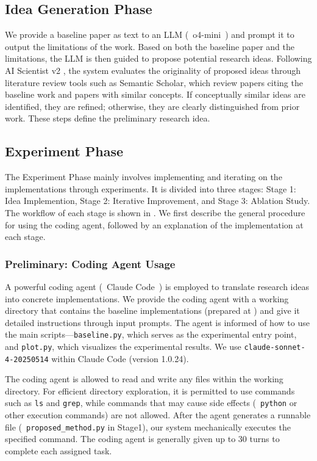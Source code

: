\subsection{Idea Generation Phase}
\label{subsec_idea_generation}
We provide a baseline paper as text to an LLM (\eg~o4-mini~\citep{o3-o4-mini}) and prompt it to output the limitations of the work. Based on both the baseline paper and the limitations, the LLM is then guided to propose potential research ideas.
Following AI Scientist v2 \citep{yamada2025ai}, the system evaluates the originality of proposed ideas through literature review tools such as Semantic Scholar, which review papers citing the baseline work and papers with similar concepts. If conceptually similar ideas are identified, they are refined; otherwise, they are clearly distinguished from prior work.
These steps define the preliminary research idea. 
\subsection{Experiment Phase}
The Experiment Phase mainly involves implementing and iterating on the implementations through experiments.
It is divided into three stages: Stage 1: Idea Implemention, Stage 2: Iterative Improvement, and Stage 3: Ablation Study. The workflow of each stage is shown in .
We first describe the general procedure for using the coding agent, followed by an explanation of the implementation at each stage.

\label{subsec_experiment}
\subsubsection{Preliminary: Coding Agent Usage}

A powerful coding agent (\eg~Claude Code~\citep{claude_code}) is employed to translate research ideas into concrete implementations.
We provide the coding agent with a working directory that contains the baseline implementations (prepared at ) and give it detailed instructions through input prompts.  
The agent is informed of how to use the main scripts—\texttt{baseline.py}, which serves as the experimental entry point, and \texttt{plot.py}, which visualizes the experimental results.  
We use \texttt{claude-sonnet-4-20250514} within Claude Code (version 1.0.24).

The coding agent is allowed to read and write any files within the working directory.  
For efficient directory exploration, it is permitted to use commands such as \texttt{ls} and \texttt{grep}, while commands that may cause side effects (\eg~\texttt{python} or other execution commands) are not allowed.  
After the agent generates a runnable file (\eg~\texttt{proposed\_method.py} in Stage1), our system mechanically executes the specified command.  
The coding agent is generally given up to 30 turns to complete each assigned task.

